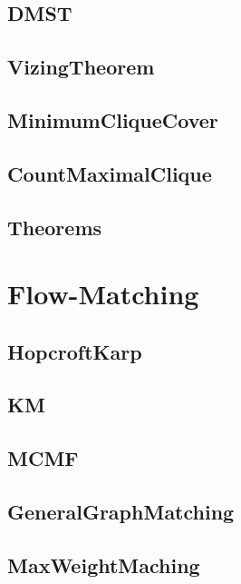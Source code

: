 	\subsection{DMST}
	
	\subsection{VizingTheorem}
	
	\subsection{MinimumCliqueCover}
	
	\subsection{CountMaximalClique}
	
	\subsection{Theorems}
	
\section{Flow-Matching}
	\subsection{HopcroftKarp}
	
	\subsection{KM}
	
	\subsection{MCMF}
	
	\subsection{GeneralGraphMatching}
	
	\subsection{MaxWeightMaching}
	
